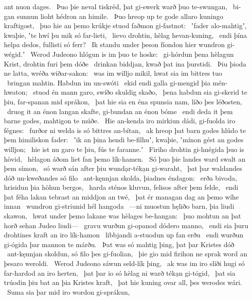 ant nuon dages. \hld\ Þuo þie neval tiskréd,
þat gi-swerk warð þuo te-swungan, \hld\ bi-gan sunnun lioht
hédron an himile. \hld\ Þuo hreop up te gode
allaro kuningo kraftigost, \hld\ þuo hie an þemo krúkje stuod
faðmon gi-fastnot: \hld\ ʽfader alo-mahtigʼ, kwaþie,
ʽte hwí þu mik só far-lieti, \hld\ lievo drohtin,
hèlag hevan-kuning, \hld\ endi þína helpa dedos,
fullisti só ferr? \hld\ Ik standu under þeson fíondon hier
wundron gi-wégid.ʼ \hld\ Werod Judeono
hlógun is im þuo te hoske: \hld\ gi-hórdun þena hèlagun Krist,
drohtin furi þem dóðe \hld\ drinkan biddjan,
kwað þat ina þurstidi. \hld\ Þiu þioda ne latta,
wréða wiðar-sakon: \hld\ was im willjo mikil,
hwat sia im bittres tuo \hld\ bringan mahtin.
Habdun im un-swóti \hld\ ekid endi galla
gi-mengid þia mén-hwaton; \hld\ stuod én mann garo,
swíðo skuldig skaðo, \hld\ þena habdun sia gi-skerid te þiu,
far-spanan mid sprákon, \hld\ þat hie sia en éna spunsia nam,
líðo þes léðosten, \hld\ druog it an énon langan skafte,
gi-bundan an énon bóme \hld\ endi deda it þem barne godes,
mahtigon te múðe. \hld\ Hie an-kenda iro mirkiun dádi,
gi-fuolda iro fégnes: \hld\ furðor ni welda
is só bittres an-bítan, \hld\ ak hreop þat barn godes
hlúdo te þem himiliskon fader: \hld\ ʽik an þina hendi be-filhuʼ, kwaþie,
ʽmínon gést an godes willjon; \hld\ hie ist nu garo te þiu,
fús te faranne.ʼ \hld\ Firiho drohtin
gi-hnégida þuo is hòvid, \hld\ hèlagon áðom
liet fan þemo lík-hamen. \hld\ Só þuo þie landes ward
swalt an þem símon, \hld\ só warð sán after þiu
wundạr-tékạn gi-waraht, \hld\ þat þar waldandes dóð
un-kweðandes só filo \hld\ ant-kęnnjan skolda,
þiadnes éndagon: \hld\ erða bivoda,
hrisidun þia hòhun bergos, \hld\ harda sténos kluvun,
felisos after þem felde, \hld\ endi þat féha lakan tebrast
an middjon an twé, \hld\ þat ér managan dag
an þemo wíhe innan \hld\ wundron gi-striunid
hél hangoda \hld\ —ni muostun hęliðo barn,
þia liudi skawon, \hld\ hwat under þemo lakane was
hèlages be-hangan: \hld\ þuo mohtun an þat horð sehan
Judeo liudi— \hld\ gravu wurðun gi-opanod
dódero manno, \hld\ endi sia þuru drohtines kraft
an iro lík-hamon \hld\ libbjandi a-stuodun
up fan erðu \hld\ endi wurðun gi-ógida þar
mannon te márðu. \hld\ Þat was só mahtig þing,
þat þar Kristes dóð \hld\ ant-kęnnjan skoldun,
só filo þes gi-fuolian, \hld\ þie gio mid firihon ne sprak
word an þesaro weroldi. \hld\ Werod Judeono
sáwun seld-lík þing, \hld\ ak was im iro slíði hugi
só far-hardod an iro herten, \hld\ þat þar io só hèlag ni warð
tékạn gi-tógid, \hld\ þat sia trúodin þiu bat
an þia Kristes kraft, \hld\ þat hie kuning ovar all,
þes werodes wári. \hld\ Suma sia þar mid iro wordon gi-sprákun,

